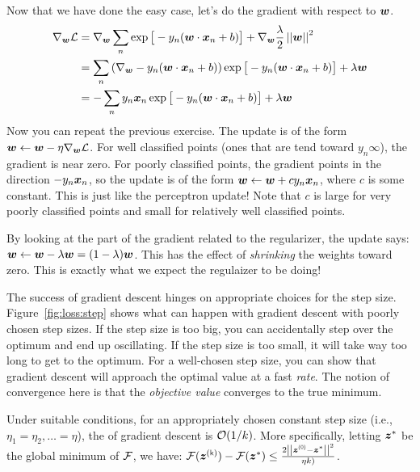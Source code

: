 
Now that we have done the easy case, let's do the gradient with
respect to ${\boldsymbol{w}}$.
%
\begin{align}
\nabla_{\boldsymbol{w}} \mathcal{L}
&= \nabla_{\boldsymbol{w}} \sum_n \exp\big[-y_n (\boldsymbol{w} \cdot {\boldsymbol{x}}_n+b)\big] 
 + \nabla_{\boldsymbol{w}}\frac {\lambda} 2 \left\vert\left\vert {\boldsymbol{w}} \right\vert\right\vert^2 \\
&= \sum_n \left( \nabla_{\boldsymbol{w}} -y_n (\boldsymbol{w} \cdot {\boldsymbol{x}}_n+b) \right) \exp\big[-y_n (\boldsymbol{w} \cdot {\boldsymbol{x}}_n+b)\big] 
 + \lambda {\boldsymbol{w}} \\
&= -\sum_n y_n {\boldsymbol{x}}_n \exp\big[-y_n (\boldsymbol{w} \cdot {\boldsymbol{x}}_n+b)\big] 
 + \lambda {\boldsymbol{w}}
\end{align}
%
Now you can repeat the previous exercise.  The update is of the form
${\boldsymbol{w}} \leftarrow {\boldsymbol{w}} - \eta \nabla_{\boldsymbol{w}} \mathcal{L}$.  For well classified points
(ones that are tend toward $y_n \infty$), the gradient is near zero.
For poorly classified points, the gradient points in the direction
$-y_n{\boldsymbol{x}}_n$, so the update is of the form ${\boldsymbol{w}} \leftarrow {\boldsymbol{w}} + c
y_n{\boldsymbol{x}}_n$, where $c$ is some constant.  This is just like the
perceptron update!  Note that $c$ is large for very poorly classified
points and small for relatively well classified points.

By looking at the part of the gradient related to the regularizer, the
update says: ${\boldsymbol{w}} \leftarrow {\boldsymbol{w}} - \lambda {\boldsymbol{w}} = (1-\lambda) {\boldsymbol{w}}$.  This has
the effect of \emph{shrinking} the weights toward zero.  This is
exactly what we expect the regulaizer to be doing!


The success of gradient descent hinges on appropriate choices for the
step size.  Figure~\ref{fig:loss:step} shows what can happen with
gradient descent with poorly chosen step sizes.  If the step size is
too big, you can accidentally step over the optimum and end up
oscillating.  If the step size is too small, it will take way too long
to get to the optimum.  For a well-chosen step size, you can show that
gradient descent will approach the optimal value at a fast
\emph{rate}.  The notion of convergence here is that the
\emph{objective value} converges to the true minimum.

\begin{theorem} \label{thm:loss:gd}
  Under suitable conditions, for an appropriately chosen
  constant step size (i.e., $\eta_1 = \eta_2, \dots = \eta$), the
   of gradient descent is $\mathcal{O}(1/k)$.  More
  specifically, letting ${\boldsymbol{z}}^*$ be the global minimum of $\mathcal{F}$, we
  have: $\cF(\vz\kth) - \cF(\vz^*) \leq \frac {2
    \norm{\vz\zth-\vz^*}^2} {\eta k)}$.
\end{theorem}

